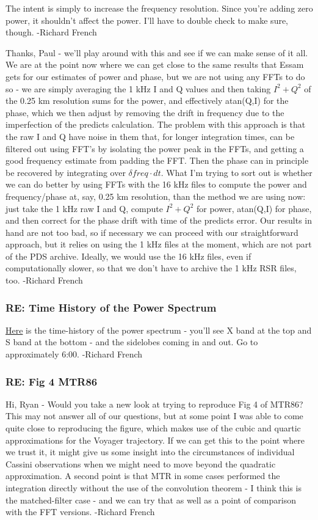 \documentclass[crop=false,class=book]{standalone}
\begin{document}
The intent is simply to increase the frequency resolution.  Since you’re adding zero power, it shouldn’t affect the power.  I’ll have to double check to make sure, though. -Richard French\par
Thanks, Paul - we'll play around with this and see if we can make sense of it all. We are at the point now where we can get close to the same results that Essam gets for our estimates of power and phase, but we are not using any FFTs to do so - we are simply averaging the 1 kHz I and Q values and then taking $I^{2} + Q^{2}$ of the 0.25 km resolution sums for the power, and effectively atan(Q,I) for the phase, which we then adjust by removing the drift in frequency due to the imperfection of the predicts calculation. The problem with this approach is that the raw I and Q have noise in them that, for longer integration times, can be filtered out using FFT's by isolating the power peak in the FFTs, and getting a good frequency estimate from padding the FFT. Then the phase can in principle be recovered by integrating over $\delta freq\cdot dt$. What I'm trying to sort out is whether we can do better by using FFTs with the 16 kHz files to compute the power and frequency/phase at, say, 0.25 km resolution, than the method we are using now: just take the 1 kHz raw I and Q, compute $I^{2} + Q^{2}$ for power, atan(Q,I) for phase, and then correct for the phase drift with time of the predicts error. Our results in hand are not too bad, so if necessary we can proceed with our straightforward approach, but it relies on using the 1 kHz files at the moment, which are not part of the PDS archive. Ideally, we would use the 16 kHz files, even if computationally slower, so that we don't have to archive the 1 kHz RSR files, too. -Richard French
\subsubsection{\footnotesize RE: Time History of the Power Spectrum}
\href{https://www.youtube.com/watch?time_continue=2&v=s-Xw6i61N9o}{Here} is the time-history of the power spectrum - you'll see X band at the top and S band at the bottom - and the sidelobes coming in and out. Go to approximately 6:00. -Richard French
\subsubsection{\footnotesize RE: Fig 4 MTR86}
Hi, Ryan - Would you take a new look at trying to reproduce Fig 4 of MTR86? This may not answer all of our questions, but at some point I was able to come quite close to reproducing the figure, which makes use of the cubic and quartic approximations for the Voyager trajectory. If we can get this to the point where we trust it, it might give us some insight into the circumstances of individual Cassini observations when we might need to move beyond the quadratic approximation.
A second point is that MTR in some cases performed the integration directly without the use of the convolution theorem - I think this is the matched-filter case - and we can try that as well as a point of comparison with the FFT versions. -Richard French
\end{document}
